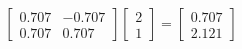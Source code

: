 \documentclass[preview]{standalone}
\begin{document}
\begin{align*}
\begin{bmatrix} 0.707 & -0.707 \\ 0.707 & 0.707 \end{bmatrix} \begin{bmatrix} 2 \\ 1 \end{bmatrix} = \begin{bmatrix} 0.707 \\ 2.121 \end{bmatrix}
\end{align*}
\end{document}
